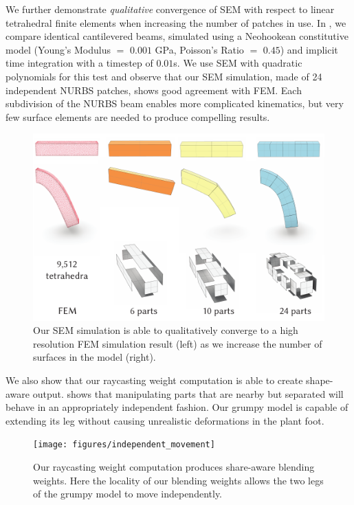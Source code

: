 We further demonstrate \emph{qualitative} convergence of SEM with respect to linear tetrahedral finite elements when increasing the number of patches in use.
In , we compare identical cantilevered beams, simulated using a Neohookean constitutive model (Young's Modulus $=$ $0.001$ GPa, Poisson's Ratio $=$ $0.45$) and implicit time integration with a timestep of $0.01$s. 
We use SEM with quadratic polynomials for this test and observe that our SEM simulation, made of 24 independent NURBS patches, shows good agreement with FEM. Each subdivision of the NURBS beam enables more complicated kinematics, 
but very few surface elements are needed to produce compelling results.

\begin{figure}[h]
  \includegraphics[width=\columnwidth]{figures/beams.pdf}
  \caption{Our SEM simulation is able to qualitatively converge to a high resolution FEM simulation result (left) as we increase the number of surfaces in the model (right). }
  \label{fig:convergence}
\end{figure}

We also show that our raycasting weight computation is able to create shape-aware output.  shows that manipulating
parts that are nearby but separated will behave in an appropriately independent fashion. Our grumpy model is capable of extending 
its leg without causing unrealistic deformations in the plant foot.

\begin{figure}[h]
  \texttt{[image: figures/independent\_movement]}
  \caption{Our raycasting weight computation produces share-aware blending weights. Here the locality of our blending weights allows the two legs of the grumpy model to move independently. }
  \label{fig:independence}
\end{figure}

